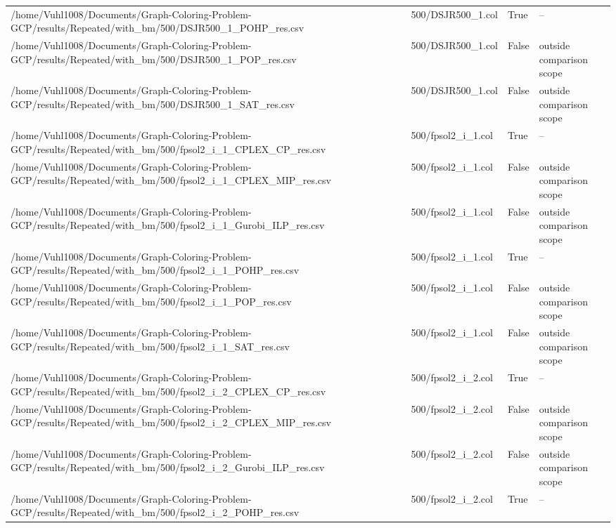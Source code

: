 \begin{table}[htbp]
\begin{tabular}{llll}
/home/Vuhl1008/Documents/Graph-Coloring-Problem-GCP/results/Repeated/with\_bm/500/DSJR500\_1\_POHP\_res.csv & 500/DSJR500\_1.col & True & -- \\
/home/Vuhl1008/Documents/Graph-Coloring-Problem-GCP/results/Repeated/with\_bm/500/DSJR500\_1\_POP\_res.csv & 500/DSJR500\_1.col & False & outside comparison scope \\
/home/Vuhl1008/Documents/Graph-Coloring-Problem-GCP/results/Repeated/with\_bm/500/DSJR500\_1\_SAT\_res.csv & 500/DSJR500\_1.col & False & outside comparison scope \\
/home/Vuhl1008/Documents/Graph-Coloring-Problem-GCP/results/Repeated/with\_bm/500/fpsol2\_i\_1\_CPLEX\_CP\_res.csv & 500/fpsol2\_i\_1.col & True & -- \\
/home/Vuhl1008/Documents/Graph-Coloring-Problem-GCP/results/Repeated/with\_bm/500/fpsol2\_i\_1\_CPLEX\_MIP\_res.csv & 500/fpsol2\_i\_1.col & False & outside comparison scope \\
/home/Vuhl1008/Documents/Graph-Coloring-Problem-GCP/results/Repeated/with\_bm/500/fpsol2\_i\_1\_Gurobi\_ILP\_res.csv & 500/fpsol2\_i\_1.col & False & outside comparison scope \\
/home/Vuhl1008/Documents/Graph-Coloring-Problem-GCP/results/Repeated/with\_bm/500/fpsol2\_i\_1\_POHP\_res.csv & 500/fpsol2\_i\_1.col & True & -- \\
/home/Vuhl1008/Documents/Graph-Coloring-Problem-GCP/results/Repeated/with\_bm/500/fpsol2\_i\_1\_POP\_res.csv & 500/fpsol2\_i\_1.col & False & outside comparison scope \\
/home/Vuhl1008/Documents/Graph-Coloring-Problem-GCP/results/Repeated/with\_bm/500/fpsol2\_i\_1\_SAT\_res.csv & 500/fpsol2\_i\_1.col & False & outside comparison scope \\
/home/Vuhl1008/Documents/Graph-Coloring-Problem-GCP/results/Repeated/with\_bm/500/fpsol2\_i\_2\_CPLEX\_CP\_res.csv & 500/fpsol2\_i\_2.col & True & -- \\
/home/Vuhl1008/Documents/Graph-Coloring-Problem-GCP/results/Repeated/with\_bm/500/fpsol2\_i\_2\_CPLEX\_MIP\_res.csv & 500/fpsol2\_i\_2.col & False & outside comparison scope \\
/home/Vuhl1008/Documents/Graph-Coloring-Problem-GCP/results/Repeated/with\_bm/500/fpsol2\_i\_2\_Gurobi\_ILP\_res.csv & 500/fpsol2\_i\_2.col & False & outside comparison scope \\
/home/Vuhl1008/Documents/Graph-Coloring-Problem-GCP/results/Repeated/with\_bm/500/fpsol2\_i\_2\_POHP\_res.csv & 500/fpsol2\_i\_2.col & True & -- \\

\end{tabular}
\end{table}
